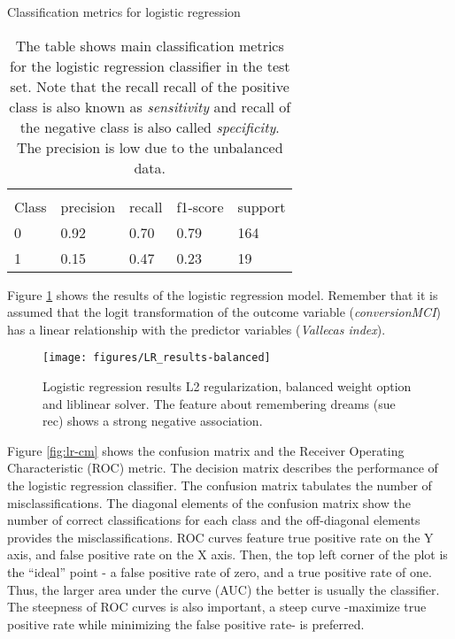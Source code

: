 \documentclass[11pt]{article}
\theoremstyle{definition}
\theoremstyle{remark}
\begin{document}
{\begin{table}[H]
\caption{Classification metrics for logistic regression} \label{tab:logreg} 
\begin{center} 
\begin{tabular}{lllll}
\hline
\multicolumn{1}{c}{} \\
Class & precision & recall & f1-score & support     \\
\hline
0 & 0.92  &    0.70   &   0.79   &    164 \\
1 & 0.15  &    0.47   &   0.23   &     19 \\
\hline
\end{tabular}
\caption{The table shows  main classification metrics for the logistic regression classifier in the test set. Note that the recall recall of the positive class is also known as \emph{sensitivity} and recall of the negative class is also called \emph{specificity}. The precision is low due to the unbalanced data.}
\end{center}
\end{table}


Figure \ref{fig:logresres} shows the results of the logistic regression model. Remember that it is assumed that the logit transformation of the outcome variable (\emph{conversionMCI}) has a linear relationship with the predictor variables (\emph{Vallecas index}).

\begin{figure}[H]
        \centering
        \texttt{[image: figures/LR\_results-balanced]}
        \caption{Logistic regression results L2 regularization, balanced weight option and liblinear solver. The feature about remembering dreams (sue rec) shows a strong negative association.} \label{fig:logresres}
\end{figure}


Figure \ref{fig:lr-cm} shows the confusion matrix and the Receiver Operating Characteristic (ROC) metric. The decision matrix describes the performance of the logistic regression classifier. The confusion matrix tabulates the number of misclassifications. The diagonal elements of the confusion matrix show the number of correct classifications for each class and the off-diagonal elements provides the misclassifications. 
ROC curves feature true positive rate on the Y axis, and false positive rate on the X axis. Then, the top left corner of the plot is the “ideal” point - a false positive rate of zero, and a true positive rate of one. 
Thus, the larger area under the curve (AUC) the better is usually the classifier.
The steepness of ROC curves is also important, a steep curve -maximize true positive rate while minimizing the false positive rate- is preferred.

}
\end{document}
